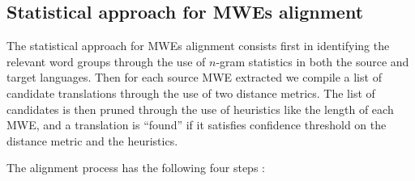 \documentclass[output=paper,modfonts,nonflat]{langsci/langscibook}
\begin{document}
\subsection{Statistical approach for MWEs alignment}

The statistical approach for MWEs alignment consists first in identifying the relevant word groups through the use of $n$-gram statistics in both the source and target languages. 
Then for each source MWE extracted we compile a list of candidate translations through the use of two distance metrics. 
The list of candidates is then pruned through the use of heuristics like the length of each MWE, and a translation is ``found'' if it satisfies confidence threshold on the distance metric and the heuristics.

The alignment process has the following four steps \citep{semmar2010hybrid}:
\end{document}
